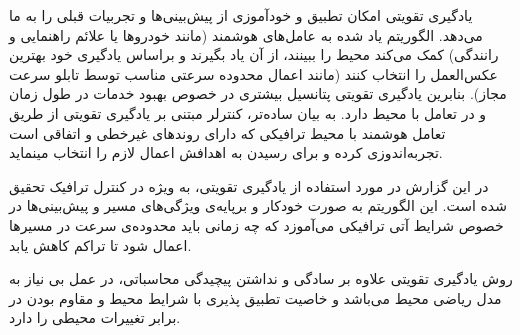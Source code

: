 یادگیری تقویتی امکان تطبیق و خودآموزی از پیش‌بینی‌ها و تجربیات قبلی را به ما می‌دهد. الگوریتم یاد شده به عامل‌های هوشمند (مانند خودروها یا علائم راهنمایی و رانندگی) کمک می‌کند محیط را ببینند، از آن یاد بگیرند و براساس یادگیری خود بهترین عکس‌العمل را انتخاب کنند (مانند اعمال محدوده سرعتی مناسب توسط تابلو سرعت مجاز). بنابرین یادگیری تقویتی پتانسیل بیشتری در خصوص بهبود خدمات در طول زمان و در تعامل با محیط دارد.
به بيان ساده‌تر، کنترلر مبتنی بر يادگيری تقويتی از طريق
تعامل هوشمند با محيط ترافيكی که دارای روندهای غيرخطی و اتفاقی است تجربه‌اندوزی کرده و برای رسيدن به اهدافش اعمال لازم را
انتخاب مینمايد.

در این گزارش در مورد استفاده از یادگیری تقویتی، به ویژه  در کنترل ترافیک تحقیق شده است.
این الگوریتم به صورت خودکار و برپایه‌ی ویژگی‌های مسیر و پیش‌بینی‌ها در خصوص شرایط آتی ترافیکی می‌آموزد که چه زمانی باید محدوده‌ی سرعت در مسیرها اعمال شود تا تراکم کاهش یابد.

روش یادگیری تقویتی علاوه بر سادگی و نداشتن پیچیدگی محاسباتی، در عمل بی نیاز به مدل ریاضی محیط می‌باشد و خاصیت تطبیق پذیری با شرایط محیط و مقاوم بودن در برابر تغییرات محیطی را دارد.	